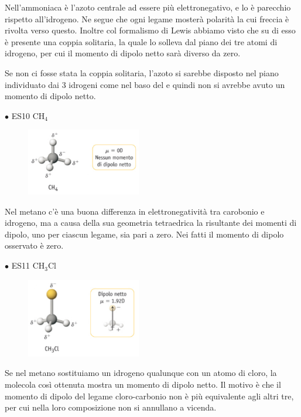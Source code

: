 \vspace{-0.4cm}Nell'ammoniaca è l'azoto centrale ad essere più elettronegativo, e lo è parecchio rispetto all'idrogeno. Ne segue che ogni legame mosterà polarità la cui freccia è rivolta verso questo. Inoltre col formalismo di Lewis abbiamo visto che su di esso è presente una coppia solitaria, la quale lo solleva dal piano dei tre atomi di idrogeno, per cui il momento di dipolo netto sarà diverso da zero.

Se non ci fosse stata la coppia solitaria, l'azoto si sarebbe disposto nel piano individuato dai 3 idrogeni come nel baso del  e quindi non si avrebbe avuto un momento di dipolo netto.

\vspace{0.2cm}$\bullet$ ES10 CH$_4$

\begin{figure}[htp]
    \centering
    \includegraphics[width=5cm]{immagini/CH_4.png}
\end{figure}

\vspace{-0.4cm}Nel metano c'è una buona differenza in elettronegatività tra carobonio e idrogeno, ma a causa della sua geometria tetraedrica la risultante dei momenti di dipolo, uno per ciascun legame, sia pari a zero. Nei fatti il momento di dipolo osservato è zero.

\vspace{0.2cm}$\bullet$ ES11 CH$_3$Cl

\begin{figure}[htp]
    \centering
    \includegraphics[width=5cm]{immagini/CH_3Cl.png}
\end{figure}

Se nel metano sostituiamo un idrogeno qualunque con un atomo di cloro, la molecola così ottenuta mostra un momento di dipolo netto. Il motivo è che il momento di dipolo del legame cloro-carbonio non è più equivalente agli altri tre, per cui nella loro composizione non si annullano a vicenda.

